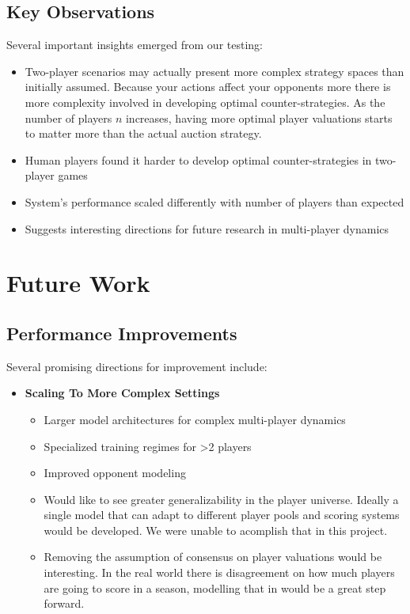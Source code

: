 \documentclass[11pt]{article}
\begin{document}
\subsection{Key Observations}
Several important insights emerged from our testing:

\begin{itemize}
    \item Two-player scenarios may actually present more complex strategy spaces than initially assumed. Because your actions affect your opponents more there is more complexity involved in developing optimal counter-strategies. As the number of players $n$ increases, having more optimal player valuations starts to matter more than the actual auction strategy.
    \item Human players found it harder to develop optimal counter-strategies in two-player games
    \item System's performance scaled differently with number of players than expected
    \item Suggests interesting directions for future research in multi-player dynamics
\end{itemize}


\section{Future Work}
\subsection{Performance Improvements}
Several promising directions for improvement include:

\begin{itemize}
    \item \textbf{Scaling To More Complex Settings}
    \begin{itemize}
        \item Larger model architectures for complex multi-player dynamics
        \item Specialized training regimes for >2 players
        \item Improved opponent modeling
        \item Would like to see greater generalizability in the player universe. Ideally a single model that can adapt to different player pools and scoring systems would be developed. We were unable to acomplish that in this project.
        \item Removing the assumption of consensus on player valuations would be interesting. In the real world there is disagreement on how much players are going to score in a season, modelling that in would be a great step forward.
    \end{itemize}
\end{itemize}
\end{document}
